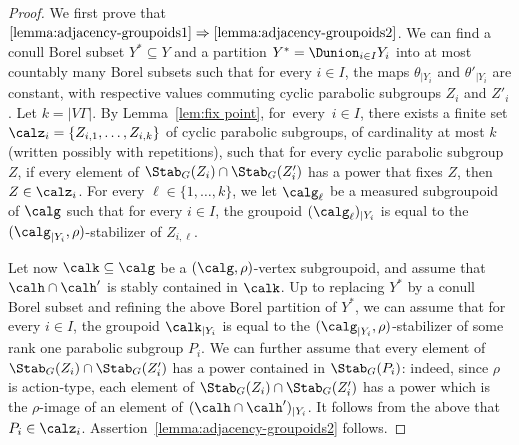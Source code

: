 \begin{proof}
We first prove that $\eqref{lemma:adjacency-groupoids1}\Rightarrow \eqref{lemma:adjacency-groupoids2}$. We can find a conull Borel subset $Y^*\subseteq Y$ and a partition $Y^*=\Dunion_{i\in I} Y_i$ into at most countably many Borel subsets such that for every $i\in I$, the maps $\theta_{|Y_i}$ and $\theta'_{|Y_i}$ are constant, with respective values commuting cyclic parabolic subgroups $Z_i$ and $Z'_i$. Let $k\!=\!|V\Gamma|$. By Lemma~\ref{lem:fix point}, for~every~\hbox{$i\!\in\!I$}, there exists a finite set $\calz_i=\{Z_{i,1},\dots,Z_{i,k}\}$ of cyclic parabolic subgroups, of cardinality at most $k$ (written possibly with repetitions), such that for every cyclic parabolic subgroup $Z$, if every element of $\Stab_G(Z_{i})\cap\Stab_G(Z'_i)$ has a power that fixes $Z$, then $Z\in\calz_i$. For every $\ell\in\{1,\dots,k\}$, we let $\calg_\ell$ be a measured subgroupoid of $\calg$ such that for every $i\in I$, the groupoid $(\calg_\ell)_{|Y_i}$ is equal to the $(\calg_{|Y_i},\rho)$-stabilizer of $Z_{i,\ell}$.

Let now $\calk\subseteq\calg$ be a $(\calg,\rho)$-vertex subgroupoid, and assume that $\calh\cap\calh'$ is stably contained in $\calk$. Up to replacing $Y^*$ by a conull Borel subset and refining the above Borel partition of $Y^*$, we can assume that for every $i\in I$, the groupoid $\calk_{|Y_i}$ is equal to the $(\calg_{|Y_i},\rho)$-stabilizer of some rank one parabolic subgroup $P_i$. We can further assume that every element of $\Stab_G(Z_i)\cap\Stab_G(Z'_i)$ has a power contained in $\Stab_G(P_i)$: indeed, since $\rho$ is action-type, each element of $\Stab_G(Z_i)\cap\Stab_G(Z'_i)$ has a power which is the $\rho$-image of an element of $(\calh\cap\calh')_{|Y_i}$. It follows from the above that $P_i\in\calz_i$. Assertion~\eqref{lemma:adjacency-groupoids2} follows.


\end{proof}
